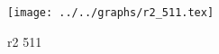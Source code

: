 \begin{figure}[h] \centering\texttt{[image: ../../graphs/r2\_511.tex]}\caption{r2 511}\label{gr:r2_511} \end{figure}
